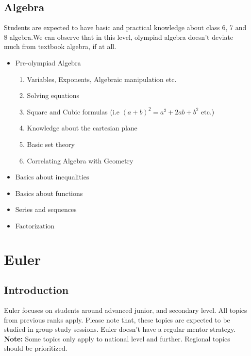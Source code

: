 \documentclass[oneside]{book}
\begin{document}
 \section{Algebra}
Students are expected to have basic and practical knowledge about class 6, 7 and 8 algebra.\newline We can observe that in this level, olympiad algebra doesn't deviate much from textbook algebra, if at all.
\begin{itemize}
    \item Pre-olympiad Algebra
        \begin{enumerate}
            \item Variables, Exponents, Algebraic manipulation etc.
            \item Solving equations
            \item Square and Cubic formulas (i.e $(a+b)^2 = a^2 + 2ab + b^2$ etc.)
            \item Knowledge about the cartesian plane
            \item Basic set theory
            \item Correlating Algebra with Geometry
        \end{enumerate}
    \item Basics about inequalities
    \item Basics about functions
    \item Series and sequences
    \item Factorization
 \end{itemize}

\chapter{Euler}
\section{Introduction}
    Euler focuses on students around advanced junior, and secondary level.
    All topics from previous ranks apply. Please note that, these topics are expected to be studied in group study sessions. Euler doesn't have a regular mentor strategy. \newline
    \textbf{Note:} Some topics only apply to national level and further. Regional topics should be prioritized.
    
\end{document}
